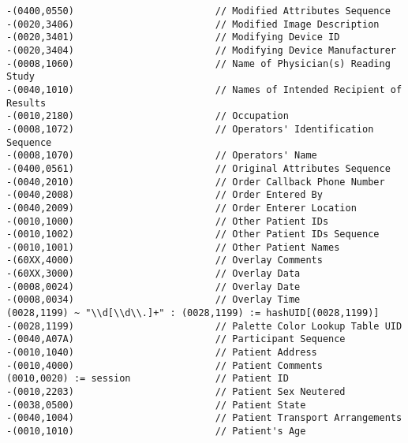 \documentclass{beamer}  %
\begin{document}
\begin{frame}[fragile]
\tiny
\begin{verbatim}
-(0400,0550)                         // Modified Attributes Sequence
-(0020,3406)                         // Modified Image Description
-(0020,3401)                         // Modifying Device ID
-(0020,3404)                         // Modifying Device Manufacturer
-(0008,1060)                         // Name of Physician(s) Reading Study
-(0040,1010)                         // Names of Intended Recipient of Results
-(0010,2180)                         // Occupation
-(0008,1072)                         // Operators' Identification Sequence
-(0008,1070)                         // Operators' Name
-(0400,0561)                         // Original Attributes Sequence
-(0040,2010)                         // Order Callback Phone Number
-(0040,2008)                         // Order Entered By
-(0040,2009)                         // Order Enterer Location
-(0010,1000)                         // Other Patient IDs
-(0010,1002)                         // Other Patient IDs Sequence
-(0010,1001)                         // Other Patient Names
-(60XX,4000)                         // Overlay Comments
-(60XX,3000)                         // Overlay Data
-(0008,0024)                         // Overlay Date
-(0008,0034)                         // Overlay Time
(0028,1199) ~ "\\d[\\d\\.]+" : (0028,1199) := hashUID[(0028,1199)]
-(0028,1199)                         // Palette Color Lookup Table UID
-(0040,A07A)                         // Participant Sequence
-(0010,1040)                         // Patient Address
-(0010,4000)                         // Patient Comments
(0010,0020) := session               // Patient ID
-(0010,2203)                         // Patient Sex Neutered
-(0038,0500)                         // Patient State
-(0040,1004)                         // Patient Transport Arrangements
-(0010,1010)                         // Patient's Age
\end{verbatim}
\end{frame}
\end{document}
